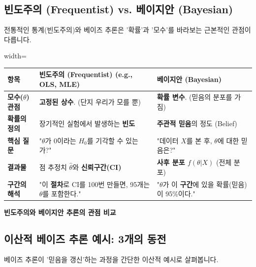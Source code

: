 \documentclass[11pt,a4paper]{book}
\providecommand{\captionof}[2]{\textbf{#2}}
\theoremstyle{definition}
\begin{document}
\subsection{빈도주의 (Frequentist) vs. 베이지안 (Bayesian)}

전통적인 통계(빈도주의)와 베이즈 추론은 '확률'과 '모수'를 바라보는 근본적인 관점이 다릅니다.

\begin{adjustbox}{width=\textwidth}
\begin{tabular}{l|l|l}
    \toprule
    \textbf{항목} & \textbf{빈도주의 (Frequentist) (e.g., OLS, MLE)} & \textbf{베이지안 (Bayesian)} \\
    \midrule
    \textbf{모수($\theta$) 관점} & \textbf{고정된 상수}. (단지 우리가 모를 뿐) & \textbf{확률 변수}. (믿음의 분포를 가짐) \\
    \textbf{확률의 정의} & 장기적인 실험에서 발생하는 \textbf{빈도} & \textbf{주관적 믿음}의 정도 (Belief) \\
    \textbf{핵심 질문} & "$\theta$가 0이라는 $H_0$를 기각할 수 있는가?" & "데이터 $X$를 본 후, $\theta$에 대한 믿음은?" \\
    \textbf{결과물} & 점 추정치 $\hat{\theta}$와 \textbf{신뢰구간(CI)} & \textbf{사후 분포 $f(\theta|X)$} (전체 분포) \\
    \textbf{구간의 해석} & "이 \textbf{절차}로 CI를 100번 만들면, 95개는 $\theta$를 포함한다." & "$\theta$가 이 \textbf{구간}에 있을 확률(믿음)이 95\%이다." \\
    \bottomrule
\end{tabular}
\end{adjustbox}
\captionof{table}{빈도주의와 베이지안 추론의 관점 비교}
\label{tab:freq_vs_bayes}

\subsection{이산적 베이즈 추론 예시: 3개의 동전}

베이즈 추론이 '믿음을 갱신'하는 과정을 간단한 이산적 예시로 살펴봅니다.
\end{document}
